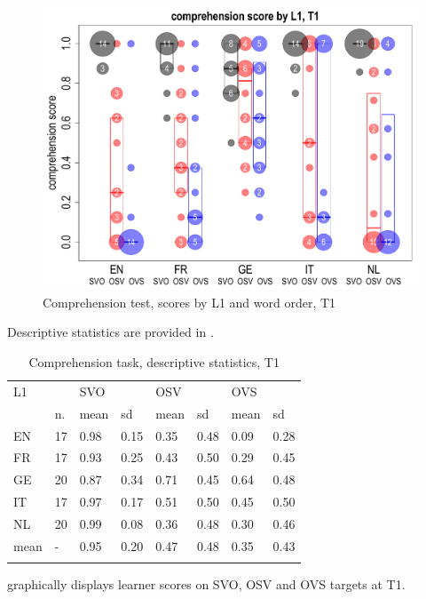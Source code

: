 \begin{figure}
    \includegraphics[width=\textwidth]{figures/05-1.pdf}
    \caption{Comprehension test, scores by L1 and word order, T1}
    \label{fig:05:1}
\end{figure}

Descriptive statistics are provided in .

\begin{table}
    \begin{tabularx}{\textwidth}{XXXXXXXX}
    \lsptoprule
    L1 &  & \multicolumn{2}{X}{SVO} & \multicolumn{2}{X}{OSV} & \multicolumn{2}{X}{OVS}\\
    & n. & mean & sd & mean & sd & mean & sd\\
    \cmidrule{2-8}
    EN & 17 & 0.98 & 0.15 & 0.35 & 0.48 & 0.09 & 0.28\\
    FR & 17 & 0.93 & 0.25 & 0.43 & 0.50 & 0.29 & 0.45\\
    GE & 20 & 0.87 & 0.34 & 0.71 & 0.45 & 0.64 & 0.48\\
    IT & 17 & 0.97 & 0.17 & 0.51 & 0.50 & 0.45 & 0.50\\
    NL & 20 & 0.99 & 0.08 & 0.36 & 0.48 & 0.30 & 0.46\\
    mean & {}- & 0.95 & 0.20 & 0.47 & 0.48 & 0.35 & 0.43\\
    \lspbottomrule
    \end{tabularx}
    \caption{Comprehension task, descriptive statistics, T1}
    \label{tab:05:1}
\end{table}

 graphically displays learner scores on SVO, OSV and OVS targets at T1.

